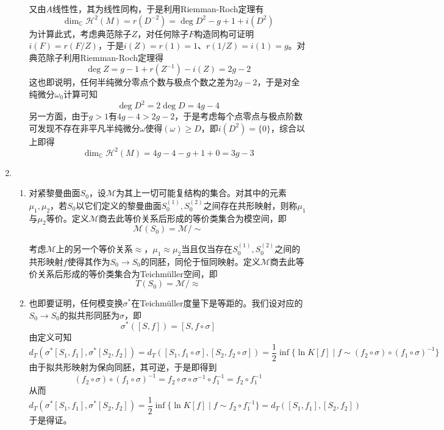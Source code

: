 \documentclass[a4paper,UTF8,fontset=windows,10pt]{ctexart}
\begin{document}
\begin{enumerate}
\begin{enumerate}
        又由$A$线性性，其为线性同构，于是利用Riemman-Roch定理有
        $$\dim_{\mathbb{C}}\mathscr{H}^2(M)=r(D^{-2})=\deg D^2-g+1+i(D^2)$$
        为计算此式，考虑典范除子$Z$，对任何除子$F$构造同构可证明$i(F)=r(F/Z)$，于是$i(Z)=r(1)=1$、$r(1/Z)=i(1)=g$。对典范除子利用Riemman-Roch定理得
        $$\deg Z=g-1+r(Z^{-1})-i(Z)=2g-2$$
        这也即说明，任何半纯微分零点个数与极点个数之差为$2g-2$，于是对全纯微分$\omega_0$计算可知
        $$\deg D^2=2\deg D=4g-4$$
        另一方面，由于$g>1$有$4g-4>2g-2$，于是考虑每个点零点与极点阶数可发现不存在非平凡半纯微分$\omega$使得$(\omega)\ge D$，即$i(D^2)=\{0\}$，综合以上即得
        $$\dim_{\mathbb{C}}\mathscr{H}^2(M)=4g-4-g+1+0=3g-3$$
    \end{enumerate}

    \item
    \begin{enumerate}
        \item 对紧黎曼曲面$S_0$，设$\mathscr{M}$为其上一切可能复结构的集合。对其中的元素$\mu_1,\mu_2$，若$S_0$以它们定义的黎曼曲面$S_0^{(1)},S_0^{(2)}$之间存在共形映射，则称$\mu_1$与$\mu_2$等价。定义$\mathscr{M}$商去此等价关系后形成的等价类集合为模空间，即
        $$\mathcal{M}(S_0)=\mathscr{M}/\sim$$

        考虑$\mathscr{M}$上的另一个等价关系$\approx$，$\mu_1\approx\mu_2$当且仅当存在$S_0^{(1)},S_0^{(2)}$之间的共形映射$f$使得其作为$S_0\to S_0$的同胚，同伦于恒同映射。定义$\mathscr{M}$商去此等价关系后形成的等价类集合为Teichm\"uller空间，即
        $$T(S_0)=\mathscr{M}/\approx$$

        \item 也即要证明，任何模变换$\sigma^*$在Teichm\"uller度量下是等距的。我们设对应的$S_0\to S_0$的拟共形同胚为$\sigma$，即
        $$\sigma^*([S,f])=[S,f\circ\sigma]$$
        由定义可知
        $$d_T(\sigma^*[S_1,f_1],\sigma^*[S_2,f_2])=d_T([S_1,f_1\circ\sigma],[S_2,f_2\circ\sigma])=\frac{1}{2}\inf\{\ln K[f]\mid f\sim(f_2\circ\sigma)\circ(f_1\circ\sigma)^{-1}\}$$
        由于拟共形映射为保向同胚，其可逆，于是即得到
        $$(f_2\circ\sigma)\circ(f_1\circ\sigma)^{-1}=f_2\circ\sigma\circ\sigma^{-1}\circ f_1^{-1}=f_2\circ f_1^{-1}$$
        从而
        $$d_T(\sigma^*[S_1,f_1],\sigma^*[S_2,f_2])=\frac{1}{2}\inf\{\ln K[f]\mid f\sim f_2\circ f_1^{-1}\}=d_T([S_1,f_1],[S_2,f_2])$$
        于是得证。
    \end{enumerate}
\end{enumerate}
\end{document}
